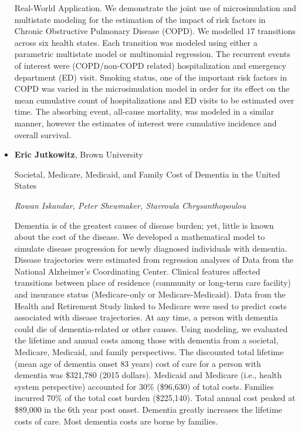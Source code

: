 \begin{itemize}
Real-World Application. We demonstrate the joint use of microsimulation and multistate modeling for the estimation of the impact of risk factors in Chronic Obstructive Pulmonary Disease (COPD). We modelled 17 transitions across six health states. Each transition was modeled using either a parametric multistate model or multinomial regression. The recurrent events of interest were (COPD/non-COPD related) hospitalization and emergency department (ED) visit. Smoking status, one of the important risk factors in COPD was varied in the microsimulation model in order for its effect on the mean cumulative count of hospitalizations and ED visits to be estimated over time. The absorbing event, all-cause mortality, was modeled in a similar manner, however the estimates of interest were cumulative incidence and overall survival. 


\item \textbf{Eric Jutkowitz}, Brown University

Societal, Medicare, Medicaid, and Family Cost of Dementia in the United States

\emph{\footnotesize Rowan Iskandar, Peter Shewmaker, Stavroula Chrysanthopoulou}

Dementia is of the greatest causes of disease burden; yet, little is known about the cost of the disease. We developed a mathematical model to simulate disease progression for newly diagnosed individuals with dementia. Disease trajectories were estimated from regression analyses of Data from the National Alzheimer’s Coordinating Center. Clinical features affected transitions between place of residence (community or long-term care facility) and insurance status (Medicare-only or Medicare-Medicaid). Data from the Health and Retirement Study linked to Medicare were used to predict costs associated with disease trajectories. At any time, a person with dementia could die of dementia-related or other causes.  Using modeling, we evaluated the lifetime and annual costs among those with dementia from a societal, Medicare, Medicaid, and family perspectives. The discounted total lifetime (mean age of dementia onset 83 years) cost of care for a person with dementia was \$321,780 (2015 dollars). Medicaid and Medicare (i.e., health system perspective) accounted for 30\% (\$96,630) of total costs. Families incurred 70\% of the total cost burden (\$225,140). Total annual cost peaked at \$89,000 in the 6th year post onset. Dementia greatly increases the lifetime costs of care. Most dementia costs are borne by families.

\end{itemize}

